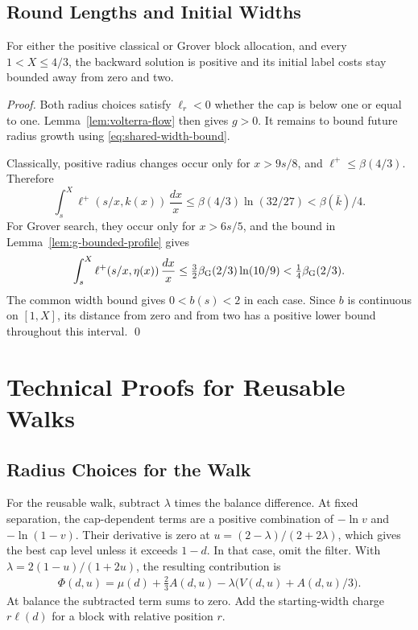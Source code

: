 \documentclass[runningheads,envcountsame,envcountsect,orivec]{llncs}
\begin{document}
\subsection{Round Lengths and Initial Widths}

\begin{lemma}
\label{lem:cg-starting-widths}
For either the positive classical or Grover block allocation,
and every $1<X\le4/3$, the backward solution is positive and
its initial label costs stay bounded away from zero and two.
\end{lemma}

\begin{proof}
Both radius choices satisfy $\ell_r<0$ whether the cap is below
one or equal to one.
Lemma~\ref{lem:volterra-flow} then gives $g>0$.
It remains to bound future radius growth using
\eqref{eq:shared-width-bound}.

Classically, positive radius changes occur only for $x>9s/8$,
and $\ell^+\le\beta(4/3)$. Therefore
\[
 \int_s^X\ell^+(s/x,k(x))\,\frac{dx}{x}
 \le\beta(4/3)\ln(32/27)<\beta(\bar k)/4.
\]
For Grover search, they occur only for $x>6s/5$, and the
bound in Lemma~\ref{lem:g-bounded-profile} gives
\[
 \int_s^X\ell^+(s/x,\eta(x))\,\frac{dx}{x}
 \le\tfrac32\beta_{\rm G}(2/3)\ln(10/9)
 <\tfrac14\beta_{\rm G}(2/3).
\]
The common width bound gives $0<b(s)<2$ in each case.
Since $b$ is continuous on $[1,X]$, its distance from zero and
from two has a positive lower bound throughout this interval.
\qed
\end{proof}

\section{Technical Proofs for Reusable Walks}
\label{app:walk-proofs}

\subsection{Radius Choices for the Walk}
\label{app:walk-radii}

For the reusable walk, subtract $\lambda$ times the balance
difference. At fixed separation, the cap-dependent terms are a
positive combination of $-\ln v$ and $-\ln(1-v)$. Their derivative
is zero at $u=(2-\lambda)/(2+2\lambda)$, which gives the best
cap level unless it exceeds $1-d$. In that case, omit the filter.
With $\lambda=2(1-u)/(1+2u)$, the resulting contribution is
\begin{align}
 \Phi(d,u)=\mu(d)+\frac23 A(d,u)
              -\lambda\bigl(V(d,u)+A(d,u)/3\bigr).
 \label{eq:q-phi}
\end{align}
At balance the subtracted term sums to zero.
Add the starting-width charge $r\ell(d)$ for a block
with relative position $r$.
\end{document}
